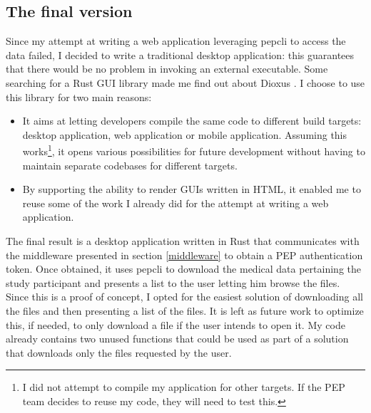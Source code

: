 \documentclass{report}
\begin{document}
\subsection{The final version}
Since my attempt at writing a web application leveraging pepcli to access the data failed, I decided to write a traditional desktop application: this guarantees that there would be
no problem in invoking an external executable. Some searching for a Rust GUI library made me find out about Dioxus \cite{dioxus}. I choose to use this library for two main reasons:

\begin{itemize}
\item It aims at letting developers compile the same code to different build targets: desktop application, web application or mobile application. Assuming this works\footnote{I did
		not attempt to compile my application for other targets. If the PEP team decides to reuse my code, they will need to test this.}, it opens various possibilities for future
		development without having to maintain separate codebases for different targets.
\item By supporting the ability to render GUIs written in HTML, it enabled me to reuse some of the work I already did for the attempt at writing a web application.
\end{itemize}

The final result is a desktop application written in Rust that communicates with the middleware presented in section \ref{middleware} to obtain a PEP authentication token. Once
obtained, it uses pepcli to download the medical data pertaining the study participant and presents a list to the user letting him browse the files. Since this is a proof of
concept, I opted for the easiest solution of downloading all the files and then presenting a list of the files. It is left as future work to optimize this, if needed, to only download 
a file if the user intends to open it. My code already contains two unused functions that could be used as part of a solution that downloads only the files requested by the user.
\end{document}
